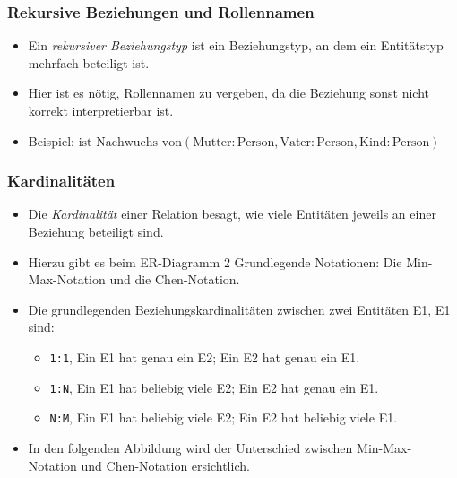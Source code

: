 			\subsubsection{Rekursive Beziehungen und Rollennamen} %
				\begin{itemize}
					\item Ein \textit{rekursiver Beziehungstyp} ist ein Beziehungstyp, an dem ein Entitätstyp mehrfach beteiligt ist.
					\item Hier ist es nötig, Rollennamen zu vergeben, da die Beziehung sonst nicht korrekt interpretierbar ist.
					\item Beispiel: \( \text{ist-Nachwuchs-von}(\text{Mutter}: \text{Person}, \text{Vater}: \text{Person}, \text{Kind}: \text{Person}) \)
				\end{itemize}
				\begin{figure}[H]
					\centering
				\end{figure}

			\subsubsection{Kardinalitäten} %
				\begin{itemize}
					\item Die \textit{Kardinalität} einer Relation besagt, wie viele Entitäten jeweils an einer Beziehung beteiligt sind.
					\item Hierzu gibt es beim ER-Diagramm 2 Grundlegende Notationen: Die Min-Max-Notation und die Chen-Notation.
					\item Die grundlegenden Beziehungskardinalitäten zwischen zwei Entitäten E1, E1 sind:
						\begin{itemize}
							\item \texttt{1:1}, Ein E1 hat genau ein E2; Ein E2 hat genau ein E1.
							\item \texttt{1:N}, Ein E1 hat beliebig viele E2; Ein E2 hat genau ein E1.
							\item \texttt{N:M}, Ein E1 hat beliebig viele E2; Ein E2 hat beliebig viele E1.
						\end{itemize}
					\item In den folgenden Abbildung wird der Unterschied zwischen \textcolor{TUDa-4\IfDarkModeTF{a}{c}}{Min-Max-Notation} und \textcolor{TUDa-1\IfDarkModeTF{a}{b}}{Chen-Notation} ersichtlich.
				\end{itemize}

